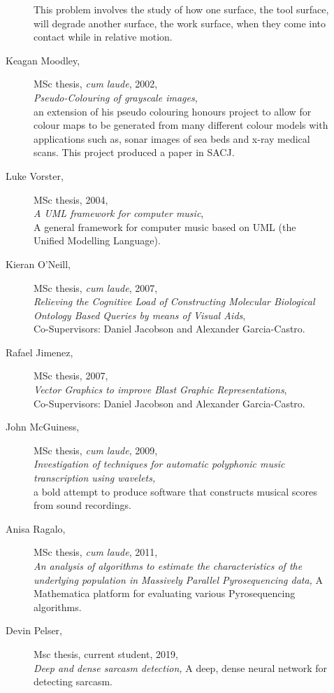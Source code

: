 \begin{description}
\begin{description}
          This problem involves the study of how one surface, the tool surface,
          will degrade another surface, the work surface,
          when they come into contact while in relative motion.
\item[Keagan Moodley,] MSc thesis, {\em cum laude}, 2002, \\
      {\em Pseudo-Colouring of grayscale images},\\
      an extension of his pseudo colouring honours project
          to allow for colour maps to be generated from many different colour models
          with applications
          such as, sonar images of sea beds and x-ray medical scans.
          This project produced a paper in SACJ.
\item[Luke Vorster,] MSc thesis, 2004, \\
       {\em A UML framework for computer music}, \\
       A general framework for computer
          music based on UML (the Unified Modelling Language).
 
 \newpage        
\item[Kieran O'Neill,] MSc thesis, {\em cum laude}, 2007, \\
       {\it Relieving the Cognitive Load of Constructing Molecular
       Biological Ontology Based Queries by means of Visual Aids}, \\
       Co-Supervisors: Daniel Jacobson and Alexander Garcia-Castro.
\item[Rafael Jimenez,] MSc thesis, 2007, \\
       {\em Vector Graphics to improve Blast Graphic
       Representations}, \\
       Co-Supervisors: Daniel Jacobson and Alexander Garcia-Castro.
\item[John McGuiness,] MSc thesis, {\em cum laude}, 2009, \\
       {\em Investigation of techniques for automatic polyphonic
       music transcription using wavelets,} \\
       a bold attempt to produce software that constructs musical
       scores from sound recordings.
\item[Anisa Ragalo,] MSc thesis, {\em cum laude}, 2011, \\
        {\em An analysis of algorithms to estimate the characteristics 
        of the underlying population in Massively Parallel Pyrosequencing data,}
        A Mathematica platform for evaluating various Pyrosequencing algorithms.
\item[Devin Pelser,] Msc thesis, current student, 2019, \\
        {\em Deep and dense sarcasm detection, } A deep, dense neural network for detecting sarcasm.
\end{description}
\end{description}
\newpage
\label{f0}
